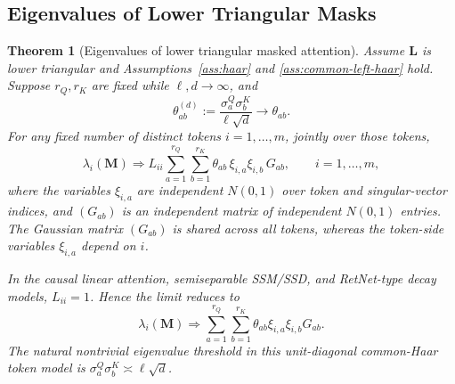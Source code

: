 \documentclass{article}
\newcommand{\weak}{\Rightarrow}
\newcommand{\bM}{\mathbf{M}}
\newcommand{\bL}{\mathbf{L}}
\newtheorem{theorem}{Theorem}
\theoremstyle{remark}
\begin{document}
\subsection{Eigenvalues of Lower Triangular Masks}

\begin{theorem}[Eigenvalues of lower triangular masked attention]
Assume $\bL$ is lower triangular and Assumptions~\ref{ass:haar} and
\ref{ass:common-left-haar} hold.  Suppose $r_Q,r_K$ are fixed while
$\ell,d\to\infty$, and
\[
    \theta_{ab}^{(d)}
    :=
    \frac{\sigma^Q_a\sigma^K_b}{\ell\sqrt d}
    \longrightarrow \theta_{ab}.
\]
For any fixed number of distinct tokens $i=1,\ldots,m$, jointly over those
tokens,
\begin{equation}
    \lambda_i(\bM)
    \weak
    L_{ii}\sum_{a=1}^{r_Q}\sum_{b=1}^{r_K}
    \theta_{ab}\,\xi_{i,a}\xi_{i,b}\,G_{ab},
    \qquad i=1,\ldots,m,
    \label{eq:common-haar-eigenvalue-limit}
\end{equation}
where the variables $\xi_{i,a}$ are independent $N(0,1)$ over token and
singular-vector indices, and $(G_{ab})$ is an independent matrix of independent
$N(0,1)$ entries.  The Gaussian matrix $(G_{ab})$ is shared across all tokens,
whereas the token-side variables $\xi_{i,a}$ depend on $i$.

In the causal linear attention, semiseparable SSM/SSD, and RetNet-type decay
models, $L_{ii}=1$.  Hence the limit reduces to
\[
    \lambda_i(\bM)
    \weak
    \sum_{a=1}^{r_Q}\sum_{b=1}^{r_K}
    \theta_{ab}\xi_{i,a}\xi_{i,b}G_{ab}.
\]
The natural nontrivial eigenvalue threshold in this unit-diagonal common-Haar
token model is $\sigma^Q_a\sigma^K_b\asymp \ell\sqrt d$.
\label{thm:lower-triangular-eigenvalues}
\end{theorem}
\end{document}
